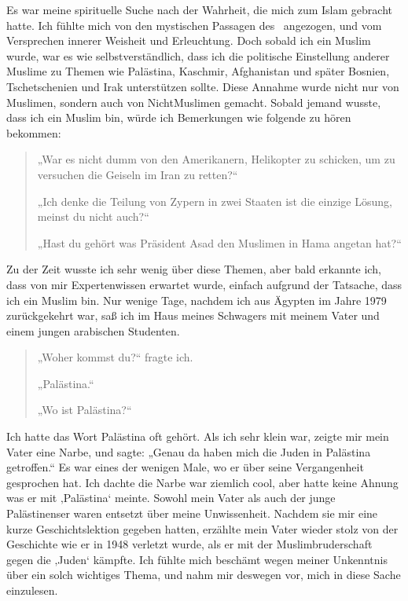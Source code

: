\documentclass[12pt]{memoir}
\begin{document}
Es war meine spirituelle Suche nach der Wahrheit,
die mich zum Islam gebracht hatte.
Ich fühlte mich von den mystischen Passagen des \Quran\ angezogen,
und vom Versprechen innerer Weisheit und Erleuchtung.
Doch sobald ich ein Muslim wurde, war es wie selbstverständlich,
dass ich die politische Einstellung anderer Muslime
zu Themen wie Palästina, Kaschmir, Afghanistan
und später Bosnien, Tschetschenien und Irak unterstützen sollte.
Diese Annahme wurde nicht nur von Muslimen,
sondern auch von Nicht\–Muslimen gemacht.
Sobald jemand wusste, dass ich ein Muslim bin,
würde ich Bemerkungen wie folgende zu hören bekommen:

\begin{quote}
„War es nicht dumm von den Amerikanern, Helikopter zu schicken,
um zu versuchen die Geiseln im Iran zu retten?“

„Ich denke die Teilung von Zypern in zwei Staaten ist die einzige Lösung,
meinst du nicht auch?“

„Hast du gehört was Präsident Asad den Muslimen in Hama angetan hat?“
\end{quote}

Zu der Zeit wusste ich sehr wenig über diese Themen,
aber bald erkannte ich, dass von mir Expertenwissen erwartet wurde,
einfach aufgrund der Tatsache, dass ich ein Muslim bin.
Nur wenige Tage, nachdem ich aus Ägypten im Jahre 1979 zurückgekehrt war,
saß ich im Haus meines Schwagers mit meinem Vater
und einem jungen arabischen Studenten.

\begin{quote}
„Woher kommst du?“ fragte ich.

„Palästina.“

„Wo ist Palästina?“
\end{quote}

Ich hatte das Wort Palästina oft gehört.
Als ich sehr klein war, zeigte mir mein Vater eine Narbe, und sagte:
„Genau da haben mich die Juden in Palästina getroffen.“
Es war eines der wenigen Male, wo er über seine Vergangenheit gesprochen hat.
Ich dachte die Narbe war ziemlich cool,
aber hatte keine Ahnung was er mit ‚Palästina‘ meinte.
Sowohl mein Vater als auch der junge Palästinenser
waren entsetzt über meine Unwissenheit.
Nachdem sie mir eine kurze Geschichtslektion gegeben hatten,
erzählte mein Vater wieder stolz von der Geschichte
wie er in 1948 verletzt wurde,
als er mit der Muslimbruderschaft gegen die ‚Juden‘ kämpfte.
Ich fühlte mich beschämt wegen meiner Unkenntnis
über ein solch wichtiges Thema,
und nahm mir deswegen vor, mich in diese Sache einzulesen.
\end{document}
